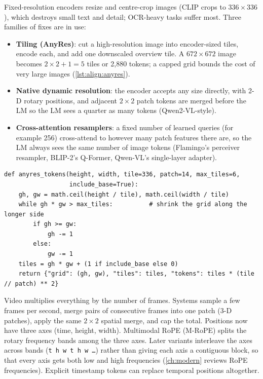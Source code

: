 Fixed-resolution encoders resize and centre-crop images (CLIP crops to $336\times336$), which
destroys small text and detail; OCR-heavy tasks suffer most. Three families of fixes are in use:
\begin{itemize}
  \item \textbf{Tiling (AnyRes)}: cut a high-resolution image into encoder-sized tiles, encode each,
        and add one downscaled overview tile. A $672\times672$ image becomes $2\times2+1=5$ tiles
        or 2{,}880 tokens; a capped grid bounds the cost of very large images (\cref{lst:align:anyres}).
  \item \textbf{Native dynamic resolution}: the encoder accepts any size directly, with 2-D rotary
        positions, and adjacent $2\times2$ patch tokens are merged before the LM so the LM sees
        a quarter as many tokens (Qwen2-VL-style).
  \item \textbf{Cross-attention resamplers}: a fixed number of learned queries (for example 256)
        cross-attend to however many patch features there are, so the LM always sees the same
        number of image tokens (Flamingo's perceiver resampler, BLIP-2's Q-Former, Qwen-VL's
        single-layer adapter).
\end{itemize}

\begin{lstlisting}[caption={AnyRes token accounting with a capped grid (\code{llmsys.vlm.anyres\_tokens}).},label={lst:align:anyres}]
def anyres_tokens(height, width, tile=336, patch=14, max_tiles=6,
                  include_base=True):
    gh, gw = math.ceil(height / tile), math.ceil(width / tile)
    while gh * gw > max_tiles:          # shrink the grid along the longer side
        if gh >= gw:
            gh -= 1
        else:
            gw -= 1
    tiles = gh * gw + (1 if include_base else 0)
    return {"grid": (gh, gw), "tiles": tiles, "tokens": tiles * (tile // patch) ** 2}
\end{lstlisting}

Video multiplies everything by the number of frames. Systems sample a few frames per second,
merge pairs of consecutive frames into one patch (3-D patches), apply the same $2\times2$ spatial
merge, and cap the total. Positions now have three axes (time, height, width). Multimodal RoPE
(M-RoPE) splits the rotary frequency bands among the three axes. Later variants interleave the
axes across bands (\texttt{t h w t h w \ldots}) rather than giving each axis a contiguous block,
so that every axis gets both low and high frequencies (\cref{ch:modern} reviews RoPE frequencies).
Explicit timestamp tokens can replace temporal positions altogether.

